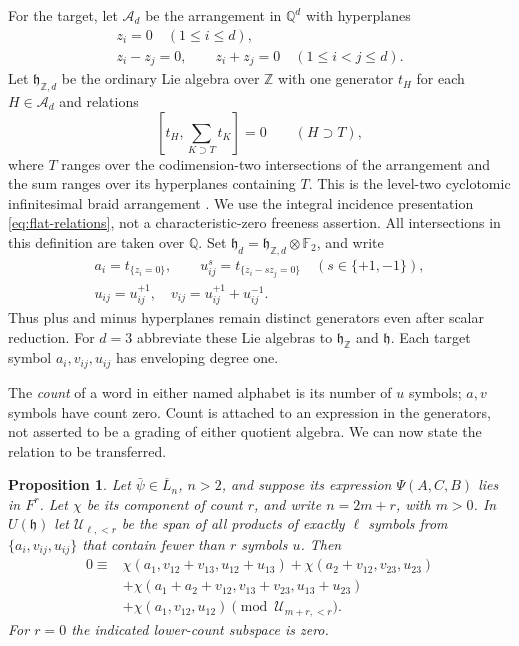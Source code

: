 \documentclass[11pt]{article}
\newtheorem{proposition}[theorem]{Proposition}
\theoremstyle{definition}
\theoremstyle{remark}
\numberwithin{equation}{section}
\begin{document}
For the target, let $\mathcal A_d$ be the arrangement in $\mathbb Q^d$ with
hyperplanes
\[
 \begin{gathered}
 z_i=0\quad(1\leq i\leq d),\\
 z_i-z_j=0,\qquad z_i+z_j=0\quad(1\leq i<j\leq d).
 \end{gathered}
\]
Let $\mathfrak h_{\mathbb Z,d}$ be the ordinary Lie algebra over $\mathbb Z$ with
one generator $t_H$ for each $H\in\mathcal A_d$ and relations
\begin{equation}\label{eq:flat-relations}
 \left[t_H,\sum_{K\supset T}t_K\right]=0
 \qquad(H\supset T),
\end{equation}
where $T$ ranges over the codimension-two intersections of the
arrangement and the sum ranges over its hyperplanes containing $T$.
This is the level-two cyclotomic infinitesimal braid arrangement
\cite[Section~1.4]{Enriquez}.  We use the integral incidence
presentation \eqref{eq:flat-relations}, not a characteristic-zero
freeness assertion.
All intersections in this definition are taken over $\mathbb Q$.
Set $\mathfrak h_d=\mathfrak h_{\mathbb Z,d}\otimes{\mathbb F_2}$, and write
\[
 \begin{gathered}
 a_i=t_{\{z_i=0\}},\qquad
 u_{ij}^s=t_{\{z_i-sz_j=0\}}\quad(s\in\{+1,-1\}),\\
 u_{ij}=u_{ij}^{+1},\quad v_{ij}=u_{ij}^{+1}+u_{ij}^{-1}.
 \end{gathered}
\]
Thus plus and minus hyperplanes remain distinct generators even after
scalar reduction.  For $d=3$ abbreviate these Lie algebras to
$\mathfrak h_\mathbb Z$ and $\mathfrak h$.  Each target symbol $a_i,v_{ij},u_{ij}$
has enveloping degree one.

The \emph{count} of a word in either named alphabet is its number of
$u$ symbols; $a,v$ symbols have count zero.  Count is attached to an
expression in the generators, not asserted to be a grading of either
quotient algebra.  We can now state the relation to be transferred.

\begin{proposition}\label{prop:leading-pentagon}
Let $\bar\psi\in\overline L_n$, $n>2$, and suppose its expression
$\Psi(A,C,B)$ lies in $F^r$.  Let $\chi$ be its component of count $r$,
and write $n=2m+r$, with $m>0$.  In $U(\mathfrak h)$ let
$\mathcal U_{\ell,<r}$ be the span of all products of exactly $\ell$
symbols from $\{a_i,v_{ij},u_{ij}\}$ that contain fewer than $r$
symbols $u$.  Then
\begin{equation}\label{eq:leading-pentagon}
\begin{split}
 0\equiv{}&\chi(a_1,v_{12}+v_{13},u_{12}+u_{13})
       +\chi(a_2+v_{12},v_{23},u_{23})\\
 &+\chi(a_1+a_2+v_{12},v_{13}+v_{23},u_{13}+u_{23})\\
 &+\chi(a_1,v_{12},u_{12})\pmod{\mathcal U_{m+r,<r}}.
\end{split}
\end{equation}
For $r=0$ the indicated lower-count subspace is zero.
\end{proposition}
\end{document}
